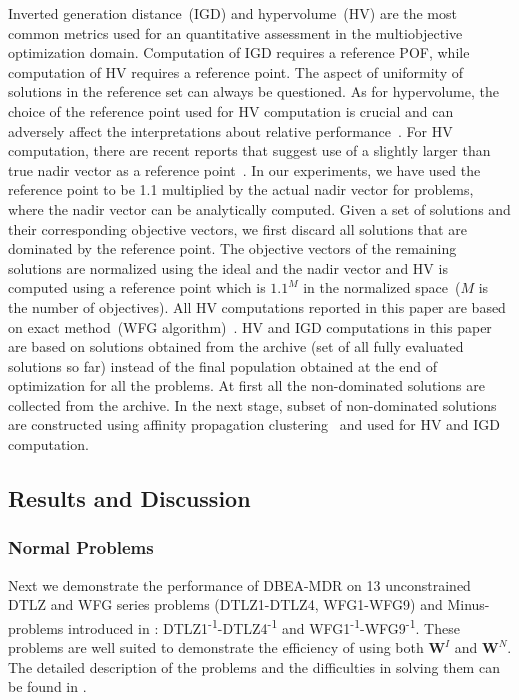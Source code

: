 \documentclass{sig-alternate}
\begin{document}
 Inverted generation distance~(IGD) and hypervolume~(HV) are the most common metrics used for an quantitative assessment in the multiobjective optimization domain. Computation of IGD requires a reference POF, while computation of HV requires a reference point. The aspect of uniformity of solutions in the reference set can always be questioned. As for hypervolume, the choice of the reference point used for HV computation is crucial and can adversely affect the interpretations about relative performance~\cite{Yuan2016many,ishibuchi2010many}. For HV computation, there are recent reports that suggest use of a slightly larger than true nadir vector as a reference point~\cite{Yuan2016many,ishibuchi2010many}. In our experiments, we have used the reference point to be 1.1 multiplied by the actual nadir vector for problems, where the nadir vector can be analytically computed. Given a set of solutions and their corresponding objective vectors, we first discard all solutions that are dominated by the reference point. The objective vectors of the remaining solutions are normalized using the ideal and the nadir vector and HV is computed using a reference point which is $1.1^M$ in the normalized space~($M$ is the number of objectives). All HV computations reported in this paper are based on exact method~(WFG algorithm)~\cite{while2012hv}. HV and IGD computations in this paper are based on solutions obtained from the archive (set of all fully evaluated solutions so far) instead of the final population obtained at the end of optimization for all the problems. At first all the non-dominated solutions are collected from the archive. In the next stage, subset of non-dominated solutions are constructed using affinity propagation clustering~\cite{apcluster2011} and used for HV and IGD computation. 

\subsection{Results and Discussion}
\label{sec:resdis}
 
\subsubsection{Normal Problems}

Next we demonstrate the performance of DBEA-MDR on 13 unconstrained DTLZ and WFG series problems (DTLZ1-DTLZ4, WFG1-WFG9) and Minus-problems introduced in \cite{ishibuchi2016inverse}: DTLZ1\textsuperscript{-1}-DTLZ4\textsuperscript{-1} and WFG1\textsuperscript{-1}-WFG9\textsuperscript{-1}. These problems are well suited to demonstrate the efficiency of using both $\mathbf{W}^I$ and $\mathbf{W}^N$. The detailed description of the problems and the difficulties in solving them can be found in \cite{ishibuchi2016inverse}. 
\end{document}
